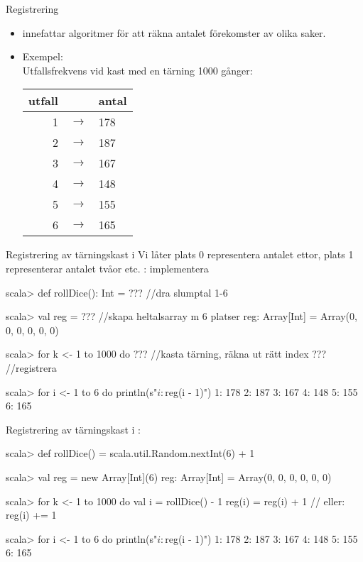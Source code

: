 


\begin{Slide}{Registrering}
\begin{itemize}
\item {} innefattar algoritmer för att räkna antalet förekomster av olika saker.

\item Exempel:
\\\vspace{0.5em}Utfallsfrekvens vid kast med en tärning 1000 gånger:

\vspace{1em}\begin{tabular}{r c l}
utfall & & antal \\ \hline
1 & $\rightarrow$ & 178 \\
2 & $\rightarrow$ & 187 \\
3 & $\rightarrow$ & 167 \\
4 & $\rightarrow$ & 148 \\
5 & $\rightarrow$ & 155 \\
6 & $\rightarrow$ & 165 \\
\end{tabular}
\end{itemize}
\end{Slide}

\begin{Slide}{Registrering av tärningskast i }
Vi låter plats 0 representera antalet ettor, plats 1 representerar antalet tvåor etc. : implementera 
\begin{REPLnonum}
scala> def rollDice(): Int = ???  //dra slumptal 1-6

scala> val reg = ???  //skapa heltalsarray m 6 platser
reg: Array[Int] = Array(0, 0, 0, 0, 0, 0)

scala> for k <- 1 to 1000 do 
         ??? //kasta tärning, räkna ut rätt index 
         ??? //registrera

scala> for i <- 1 to 6 do println(s"$i: ${reg(i - 1)}")
1: 178
2: 187
3: 167
4: 148
5: 155
6: 165
\end{REPLnonum}
\end{Slide}


\begin{Slide}{Registrering av tärningskast i }
:
\begin{REPLnonum}
scala> def rollDice() = scala.util.Random.nextInt(6) + 1

scala> val reg = new Array[Int](6)
reg: Array[Int] = Array(0, 0, 0, 0, 0, 0)

scala> for k <- 1 to 1000 do
         val i = rollDice() - 1 
         reg(i) = reg(i) + 1    // eller: reg(i) += 1


scala> for i <- 1 to 6 do println(s"$i: ${reg(i - 1)}")
1: 178
2: 187
3: 167
4: 148
5: 155
6: 165
\end{REPLnonum}
\end{Slide}

